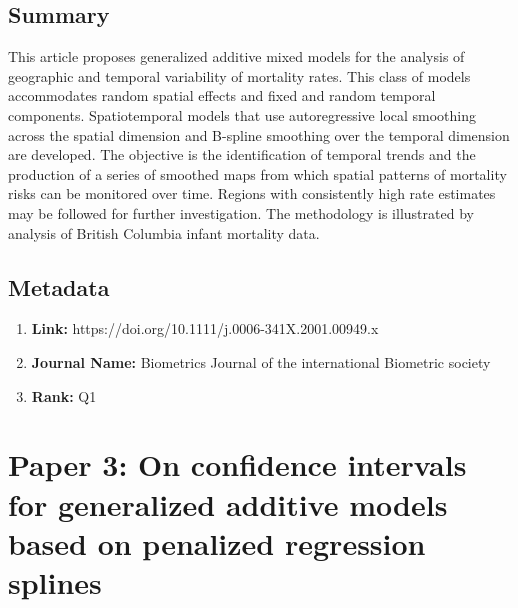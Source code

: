 \documentclass[10pt, oneside]{article}
\begin{document}
\subsection*{Summary}
This article proposes generalized additive mixed models for the analysis of geographic and temporal variability of mortality rates.
This class of models accommodates random spatial effects and fixed and random temporal components. Spatiotemporal models that
use autoregressive local smoothing across the spatial dimension and B-spline smoothing over the temporal dimension are developed.
The objective is the identification of temporal trends and the production of a series of smoothed maps from which spatial patterns
of mortality risks can be monitored over time. Regions with consistently high rate estimates may be followed for further investigation.
The methodology is illustrated by analysis of British Columbia infant mortality data. \cite{macnab2001autoregressive}
\cite{chen2012four}

\subsection*{Metadata}
\begin{enumerate}
	\item \textbf{Link:}  https://doi.org/10.1111/j.0006-341X.2001.00949.x
	\item \textbf{Journal Name:} Biometrics Journal of the international Biometric society
	\item \textbf{Rank:} Q1
\end{enumerate}

\section*{Paper 3: On confidence intervals for generalized additive models based on
  penalized regression splines}
\end{document}
